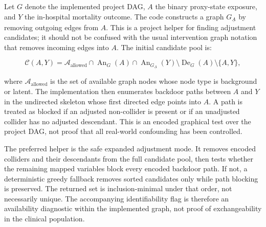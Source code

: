 Let \(G\) denote the implemented project DAG, \(A\) the binary proxy-state exposure, and \(Y\) the in-hospital mortality outcome.  The code constructs a graph \(G_{\underline{A}}\) by removing outgoing edges from \(A\).  This is a project helper for finding adjustment candidates; it should not be confused with the usual intervention graph notation that removes incoming edges into \(A\).  The initial candidate pool is:

\[
\mathcal{C}(A,Y)=
\mathcal{A}_{\mathrm{allowed}}
\cap \operatorname{An}_{G}(A)
\cap \operatorname{An}_{G_{\underline{A}}}(Y)
\setminus \operatorname{De}_{G}(A)
\setminus \{A,Y\},
\]

where \(\mathcal{A}_{\mathrm{allowed}}\) is the set of available graph nodes whose node type is background or latent.  The implementation then enumerates backdoor paths between \(A\) and \(Y\) in the undirected skeleton whose first directed edge points into \(A\).  A path is treated as blocked if an adjusted non-collider is present or if an unadjusted collider has no adjusted descendant.  This is an encoded graphical test over the project DAG, not proof that all real-world confounding has been controlled.

The preferred helper is the safe expanded adjustment mode.  It removes encoded colliders and their descendants from the full candidate pool, then tests whether the remaining mapped variables block every encoded backdoor path.  If not, a deterministic greedy fallback removes sorted candidates only while path blocking is preserved.  The returned set is inclusion-minimal under that order, not necessarily unique.  The accompanying identifiability flag is therefore an availability diagnostic within the implemented graph, not proof of exchangeability in the clinical population.

